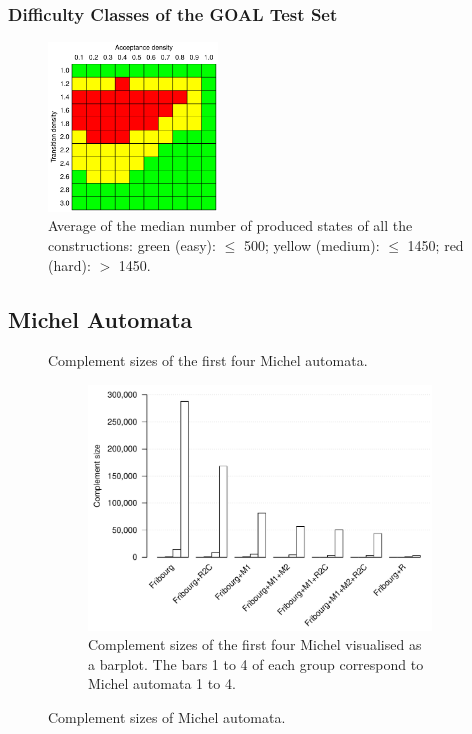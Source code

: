 \subsubsection{Difficulty Classes of the GOAL Test Set}

\begin{figure}[ht]
\centering
\includegraphics[width=0.4\textwidth]{figures/r/internal/goal/s.median.image.pdf}
\caption{Average of the median number of produced states of all the constructions: green (easy): $\leq$ 500; yellow (medium): $\leq$ 1450; red (hard): $>$ 1450.}
\end{figure}



\subsection{Michel Automata}

\begin{figure}[ht]
  \centering
  \begin{subtable}{0.75\textwidth}
    \centering
    
    \caption{Complement sizes of the first four Michel automata.}
  \end{subtable}

  \begin{subfigure}{0.75\textwidth}
    \centering
    \includegraphics[width=\textwidth]{figures/r/internal/michel/s.barplot.pdf}
    \caption{Complement sizes of the first four Michel visualised as a barplot. The bars 1 to 4 of each group correspond to Michel automata 1 to 4.}
  \end{subfigure}
  \caption{Complement sizes of Michel automata.}
\end{figure}

